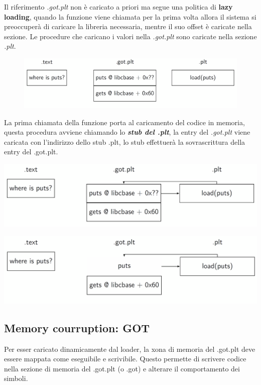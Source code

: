 Il riferimento \textit{.got.plt} non è caricato a priori ma segue una politica di \textbf{lazy loading}, quando la funzione viene chiamata per la prima volta allora il sistema si preoccuperà di caricare la libreria necessaria, mentre il suo offset è caricate nella sezione.
Le procedure che caricano i valori nella \textit{.got.plt} sono caricate nella sezione \textit{.plt}.

\begin{figure}[h!]
    \centering
    \includegraphics[width=.5\linewidth]{res/PLT_loading.png}
    \caption{}
\end{figure}

La prima chiamata della funzione porta al caricamento del codice in memoria, questa procedura avviene chiamando lo \textbf{\textit{stub del .plt}}, la entry del \textit{.got.plt} viene caricata con l'indirizzo dello stub .plt, lo stub effettuerà la sovrascrittura della entry del .got.plt.

\begin{minipage}{0.5\textwidth}
    \centering
    \includegraphics[width=.5\linewidth]{res/PLT_loading2.png}
\end{minipage}
\begin{minipage}{0.5\textwidth}
    \centering
    \includegraphics[width=.5\linewidth]{res/PLT_loading3.png}
\end{minipage}

\subsection{Memory courruption: GOT}

Per esser caricato dinamicamente dal loader, la xona di memoria del .got.plt deve essere mappata come eseguibile e scrivibile.
Questo permette di scrivere codice nella sezione di memoria del .got.plt (o .got) e alterare il comportamento dei simboli.

